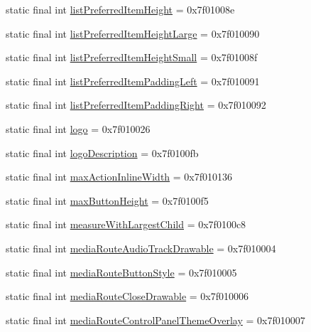 \begin{CompactItemize}
\item 
static final int \hyperlink{classandroid_1_1support_1_1v4_1_1_r_1_1attr_8a3d97af7b98d46125035b9f7912c45f}{listPreferredItemHeight} = 0x7f01008e
\item 
static final int \hyperlink{classandroid_1_1support_1_1v4_1_1_r_1_1attr_c43eb20d693666641f44ee104f48ae04}{listPreferredItemHeightLarge} = 0x7f010090
\item 
static final int \hyperlink{classandroid_1_1support_1_1v4_1_1_r_1_1attr_7ddc9d4a0378de729755aa3f8bb15da7}{listPreferredItemHeightSmall} = 0x7f01008f
\item 
static final int \hyperlink{classandroid_1_1support_1_1v4_1_1_r_1_1attr_72223050bdb40020ff830ae1dbfee036}{listPreferredItemPaddingLeft} = 0x7f010091
\item 
static final int \hyperlink{classandroid_1_1support_1_1v4_1_1_r_1_1attr_96ad82cf1792f137a9a3b8c1fcac32e0}{listPreferredItemPaddingRight} = 0x7f010092
\item 
static final int \hyperlink{classandroid_1_1support_1_1v4_1_1_r_1_1attr_b1e60b9e93763a4a4de8e84d8385b114}{logo} = 0x7f010026
\item 
static final int \hyperlink{classandroid_1_1support_1_1v4_1_1_r_1_1attr_5d44ab5ecac0ed28d951e3f052e61232}{logoDescription} = 0x7f0100fb
\item 
static final int \hyperlink{classandroid_1_1support_1_1v4_1_1_r_1_1attr_4eca41424959a7265e7ca6f821863f59}{maxActionInlineWidth} = 0x7f010136
\item 
static final int \hyperlink{classandroid_1_1support_1_1v4_1_1_r_1_1attr_1460e67c329a3b769fe5964dfe20e80c}{maxButtonHeight} = 0x7f0100f5
\item 
static final int \hyperlink{classandroid_1_1support_1_1v4_1_1_r_1_1attr_58bbf08cc2a8049acac48855a24082db}{measureWithLargestChild} = 0x7f0100c8
\item 
static final int \hyperlink{classandroid_1_1support_1_1v4_1_1_r_1_1attr_e131aa391b4d7f3dc842f3fd5897f700}{mediaRouteAudioTrackDrawable} = 0x7f010004
\item 
static final int \hyperlink{classandroid_1_1support_1_1v4_1_1_r_1_1attr_ba7152353d534419c2408c76730e6b48}{mediaRouteButtonStyle} = 0x7f010005
\item 
static final int \hyperlink{classandroid_1_1support_1_1v4_1_1_r_1_1attr_cddcc2f5481df4118d3fd68a13d82bba}{mediaRouteCloseDrawable} = 0x7f010006
\item 
static final int \hyperlink{classandroid_1_1support_1_1v4_1_1_r_1_1attr_07bad70a7963149cd297649ee348e1df}{mediaRouteControlPanelThemeOverlay} = 0x7f010007

\end{CompactItemize}
